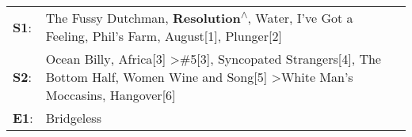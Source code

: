 \begin{supertabular}{p{0.03\textwidth}p{0.92\textwidth}}
 \textbf{S1}:  &                                                                           The Fussy Dutchman\textsuperscript{}, \enspace \textbf{Resolution\textsuperscript{$\wedge$}}, \enspace Water\textsuperscript{}, \enspace I've Got a Feeling\textsuperscript{}, \enspace Phil's Farm\textsuperscript{}, \enspace August[1]\textsuperscript{}, \enspace Plunger[2]\textsuperscript{}  \enspace  \\
 \textbf{S2}:  &  Ocean Billy\textsuperscript{}, \enspace Africa[3]\textsuperscript{} \textgreater \enspace \#5[3]\textsuperscript{}, \enspace Syncopated Strangers[4]\textsuperscript{}, \enspace The Bottom Half\textsuperscript{}, \enspace Women Wine and Song[5]\textsuperscript{} \textgreater \enspace White Man's Moccasins\textsuperscript{}, \enspace Hangover[6]\textsuperscript{}  \enspace  \\
 \textbf{E1}:  &                                                                                                                                                                                                                                                                                                                                                 Bridgeless\textsuperscript{}  \enspace  \\
\end{supertabular}
